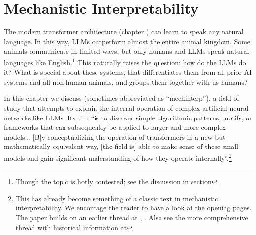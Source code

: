 \chapter{Mechanistic Interpretability}\label{ch_mechinterp}


The modern transformer architecture (chapter ) can learn to speak any natural
language. In this way, LLMs outperform
almost the entire animal kingdom. Some animals communicate in limited ways, but only humans and LLMs speak natural languages like English.\footnote{Though the topic is hotly
contested; see the discussion in section } This
naturally raises the question: how do the LLMs do it? What is special about
these systems, that differentiates them from all prior AI systems and all
non-human animals, and groups them together with us humans?

In this chapter we discuss  (sometimes
abbreviated as ``mechinterp''), a field of study that
attempts to explain the internal operation of complex artificial neural networks like LLMs. Its aim ``is
to discover simple algorithmic patterns, motifs, or frameworks that can
subsequently be applied to larger and more complex models... [B]y conceptualizing
the operation of transformers in a new but mathematically equivalent way, [the
field is] able to make sense of these small models and gain significant
understanding of how they operate
internally''\cite{elhage2021mathematical}.\footnote{This has already become
something of a classic text in mechanistic interpretability. We encourage the
reader to have a look at the opening pages. The paper builds on an earlier
thread at ,
. Also see the more comprehensive thread with historical information at } 

